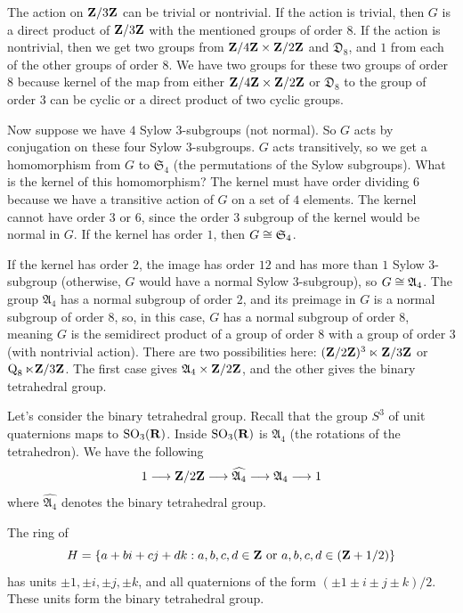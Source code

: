 \documentclass[11pt, twoside]{amsart}
\begin{document}
The action on $\mathbf{Z}/3\mathbf{Z} $ can be trivial or nontrivial. If the action is trivial, then $G$ is a direct product of $\mathbf{Z}/3\mathbf{Z} $ with the mentioned groups of order $8$. If the action is nontrivial, then we get two groups from $\mathbf{Z}/4\mathbf{Z} \times \mathbf{Z}/2\mathbf{Z} $ and $\mathfrak{D}_8$, and $1$ from each of the other groups of order $8$. We have two groups for these two groups of order $8$ because kernel of the map from either $\mathbf{Z}/4\mathbf{Z} \times \mathbf{Z}/2\mathbf{Z} $ or $\mathfrak{D}_8$ to the group of order $3$ can be cyclic or a direct product of two cyclic groups.

Now suppose we have $4$ Sylow $3$-subgroups (not normal). So $G$ acts by conjugation on these four Sylow $3$-subgroups.  $G$ acts transitively, so we get a homomorphism from $G$ to $\mathfrak{S}_4$ (the permutations of the Sylow subgroups). What is the kernel of this homomorphism? The kernel must have order dividing $6$ because we have a transitive action of $G$ on a set of $4$ elements. The kernel cannot have order $3$ or $6$, since the order $3$ subgroup of the kernel would be normal in $G$. If the kernel has order $1$, then $G\cong\mathfrak{S}_4$. 

If the kernel has order $2$, the image has order $12$ and has more than $1$ Sylow $3$-subgroup (otherwise, $G$ would have a normal Sylow $3$-subgroup), so $G\cong \mathfrak{A}_4$. The group $\mathfrak{A}_4$ has a normal subgroup of order $2$, and its preimage in $G$ is a normal subgroup of order $8$, so, in this case, $G$ has a normal subgroup of order $8$, meaning $G$ is the semidirect product of a group of order $8$ with a group of order $3$ (with nontrivial action). There are two possibilities here: $(\mathbf{Z}/2\mathbf{Z} )^3\ltimes \mathbf{Z}/3\mathbf{Z} $ or $\operatorname{Q}_8  \ltimes \mathbf{Z}/3\mathbf{Z} $. The first case gives $\mathfrak{A}_4 \times \mathbf{Z}/2\mathbf{Z} $, and the other gives the binary tetrahedral group.

Let's consider the binary tetrahedral group. Recall that the group $S^3$ of unit quaternions maps to $\operatorname{SO}_3(\mathbf R)$. Inside $\operatorname{SO}_3(\mathbf R)$ is $\mathfrak{A}_4$ (the rotations of the tetrahedron). We have the following 
$$
1 \longrightarrow \mathbf{Z}/2\mathbf{Z}  \longrightarrow \widehat{\mathfrak{A}_4} \longrightarrow \mathfrak{A}_4 \longrightarrow 1 
$$
where $\widehat{\mathfrak{A}_4}$ denotes the binary tetrahedral group. 

The ring of 
$$
H = \{ a+ bi + cj + dk : a,b,c,d \in \mathbf{Z} \textrm{ or } a,b,c,d \in (\mathbf{Z} + 1/2)\} 
$$
has units $\pm 1,\pm i ,\pm j, \pm k$, and all quaternions of the form $(\pm 1 \pm i \pm j \pm k)/2$. These units form the binary tetrahedral group.
\end{document}
